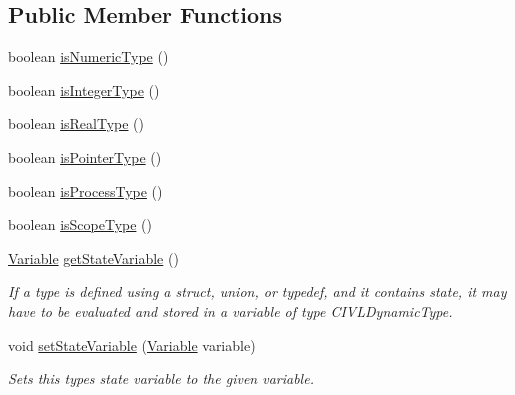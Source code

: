 \subsection*{Public Member Functions}
\begin{DoxyCompactItemize}
\item 
boolean \hyperlink{classedu_1_1udel_1_1cis_1_1vsl_1_1civl_1_1model_1_1common_1_1type_1_1CommonType_aebfaa599b2207ceb065b0a48e2c40bed}{is\+Numeric\+Type} ()
\item 
boolean \hyperlink{classedu_1_1udel_1_1cis_1_1vsl_1_1civl_1_1model_1_1common_1_1type_1_1CommonType_a0967293ecc98a7830d264d8b8d507ad8}{is\+Integer\+Type} ()
\item 
boolean \hyperlink{classedu_1_1udel_1_1cis_1_1vsl_1_1civl_1_1model_1_1common_1_1type_1_1CommonType_acf24d673f6fccc4eba5463ce74d8ee30}{is\+Real\+Type} ()
\item 
boolean \hyperlink{classedu_1_1udel_1_1cis_1_1vsl_1_1civl_1_1model_1_1common_1_1type_1_1CommonType_a38ade978bd12e428c5b41afee1234743}{is\+Pointer\+Type} ()
\item 
boolean \hyperlink{classedu_1_1udel_1_1cis_1_1vsl_1_1civl_1_1model_1_1common_1_1type_1_1CommonType_a6c20b5860d688e000b73f8b61663f69a}{is\+Process\+Type} ()
\item 
boolean \hyperlink{classedu_1_1udel_1_1cis_1_1vsl_1_1civl_1_1model_1_1common_1_1type_1_1CommonType_ad845e7568580e63395eb97890bd78b41}{is\+Scope\+Type} ()
\item 
\hyperlink{interfaceedu_1_1udel_1_1cis_1_1vsl_1_1civl_1_1model_1_1IF_1_1variable_1_1Variable}{Variable} \hyperlink{classedu_1_1udel_1_1cis_1_1vsl_1_1civl_1_1model_1_1common_1_1type_1_1CommonType_a80dee94b35a9a80cdea1e00e463dd02e}{get\+State\+Variable} ()
\begin{DoxyCompactList}\small\item\em If a type is defined using a struct, union, or typedef, and it contains state, it may have to be evaluated and stored in a variable of type C\+I\+V\+L\+Dynamic\+Type. \end{DoxyCompactList}\item 
void \hyperlink{classedu_1_1udel_1_1cis_1_1vsl_1_1civl_1_1model_1_1common_1_1type_1_1CommonType_a123146fdba6fbc7b24019945fdad1cc5}{set\+State\+Variable} (\hyperlink{interfaceedu_1_1udel_1_1cis_1_1vsl_1_1civl_1_1model_1_1IF_1_1variable_1_1Variable}{Variable} variable)
\begin{DoxyCompactList}\small\item\em Sets this type\textquotesingle{}s state variable to the given variable. \end{DoxyCompactList}\item 

\end{DoxyCompactItemize}
